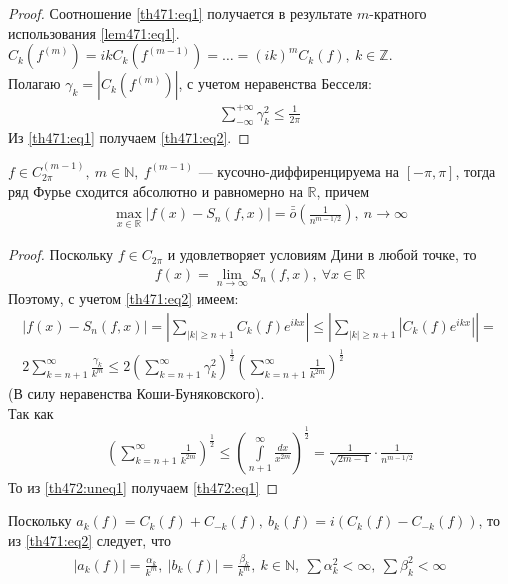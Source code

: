 \begin{proof}
  Соотношение \eqref{th471:eq1} получается в результате $m$-кратного
  использования \eqref{lem471:eq1}. \\
  $C_k(f^{(m)}) = ik C_k(f^{(m-1)}) = \dots = (ik)^m C_k(f), \ k \in
  \mathbb{Z}$. \\
  Полагаю $\gamma_k = |C_k(f^{(m)})|$, с учетом неравенства Бесселя:
  \begin{gather*}
    \sum\limits_{-\infty}^{+\infty} \gamma_k^2 \leq \frac{1}{2\pi}
  \end{gather*}
  Из \eqref{th471:eq1} получаем \eqref{th471:eq2}.
\end{proof}

\begin{theorem}
  $f \in C_{2\pi}^{(m-1)}, \ m \in \mathbb{N}, \ f^{(m-1)}$ ---
  кусочно-диффиренцируема на $[-\pi, \pi]$, тогда ряд Фурье сходится абсолютно
  и равномерно на $\mathbb{R}$, причем
  \begin{gather}
    \max\limits_{x \in \mathbb{R}} |f(x) - S_n(f,x)| =
    \bar{\bar{o}}\left(\frac{1}{n^{m - 1/2}}\right), \ n \to \infty
    \label{th472:eq1}
  \end{gather}
\end{theorem}

\begin{proof}
  Поскольку $f \in C_{2\pi}$ и удовлетворяет условиям Дини в любой точке, то
  \begin{gather*}
    f(x) = \lim\limits_{n \to \infty} S_n(f, x), \ \forall x \in \mathbb{R}
  \end{gather*}
  Поэтому, с учетом \eqref{th471:eq2} имеем:
  \begin{gather}
    |f(x) - S_n(f, x)| = \left|\sum\limits_{|k| \geq n + 1} C_k(f)
    e^{ikx}\right| \leq \left|\sum\limits_{|k| \geq n + 1}
    |C_k(f)e^{ikx}|\right| = \\
    2 \sum\limits_{k = n + 1}^{\infty} \frac{\gamma_k}{k^m} \leq
    2 \left(\sum\limits_{k = n + 1}^{\infty} \gamma_k^2 \right)^{\frac{1}{2}}
    \left(\sum\limits_{k = n + 1}^{\infty}  \frac{1}{k^{2m}}\right)^{\frac{1}{2}}
    \label{th472:uneq1}
  \end{gather}
  (В силу неравенства Коши-Буняковского). \\
  Так как
  \begin{gather*}
    \left(\sum\limits_{k = n + 1}^{\infty}
    \frac{1}{k^{2m}}\right)^{\frac{1}{2}} \leq \left(\int\limits_{n+1}^{\infty}
    \frac{dx}{x^{2m}} \right)^\frac{1}{2} = \frac{1}{\sqrt{2m-1}} \cdot
    \frac{1}{n^{m-1/2}}
  \end{gather*}
  То из \eqref{th472:uneq1} получаем \eqref{th472:eq1}
\end{proof}

\begin{remark}
  Поскольку $a_k(f) = C_k(f) + C_{-k}(f), \ b_k(f) = i(C_k(f) - C_{-k}(f))$, то
  из \eqref{th471:eq2} следует, что
  \begin{gather*}
    |a_k(f)| = \frac{\alpha_k}{k^m}, \ |b_k(f)| = \frac{\beta_k}{k^m}, \ k \in
    \mathbb{N}, \ \sum \alpha_k^2 < \infty, \ \sum \beta_k^2 < \infty
  \end{gather*}
\end{remark}

